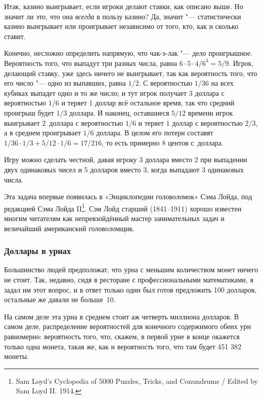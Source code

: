\documentclass[twoside]{book}
\begin{document}
\medskip
Итак, казино выигрывает, если игроки делают ставки, как описано выше.
Но значит ли это, что она \emph{всегда} в пользу казино?
Да, значит "--- статистически казино выигрывает или проигрывает независимо от того, кто, как и сколько ставит.

Конечно, несложно определить напрямую, что чак-э-лак "--- дело проигрышное.
Вероятность того, что выпадут три разных числа, равна $6\cdot 5\cdot 4/6^3=5/9$.
Игрок, делающий ставку, уже здесь ничего не выигрывает, так как вероятность того,
что его число "--- одно из выпавших, равна $1/2$.
С вероятностью $1/36$ на всех кубиках выпадет одно и то же число;
и тут игрок получает $3$ доллара с вероятностью $1/6$ и теряет 1
доллар всё остальное время, так что средний проигрыш будет $1/3$ доллара.
И наконец, оставшиеся $5/12$ времени игрок выигрывает $2$~доллара с
вероятностью $1/6$ и теряет $1$ доллар с вероятностью $2/3$, а в среднем проигрывает $1/6$ доллара.
В целом его потери составят $1/36 \cdot 1/3 + 5/12 \cdot 1/6 = 17/216$, то есть примерно $8$ центов с~доллара.

\medskip

Игру можно сделать честной, давая игроку 3 доллара вместо 2 при выпадении двух одинаковых чисел 
и 5 долларов вместо 3, когда выпадают 3 одинаковых числа.

\medskip

Эта задача впервые появилась в «Энциклопедии головоломок» Сэма Лойда,
под редакцией Сэма Лойда II\footnote{{Sam Loyd’s Cyclopedia of 5000   Puzzles, Tricks, and Conundrums} / Edited by Sam Loyd II. 1914.}.
Сэм Лойд старший (1841--1911) хорошо известен многим читателям как
непревзойдённый мастер занимательных задач и величайший американский
головоломщик.

\subsubsection*{Доллары в урнах}%

Большинство людей предположат, что урна с меньшим количеством монет ничего не стоит.
Так, недавно, сидя в ресторане с профессиональными математиками, я задал им этот вопрос, и в ответ только один был готов предложить 100 долларов, остальные же давали не больше~10.

На самом деле эта урна в среднем стоит аж четверть миллиона долларов.
В самом деле, распределение вероятностей для конечного содержимого обеих урн равномерно:
вероятность того, что, скажем, в первой урне в конце окажется только одна монета, такая же, как и вероятность того, что там будет 451 382 монеты.
\end{document}
